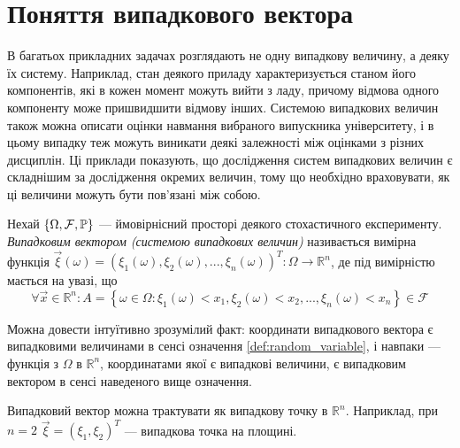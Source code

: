 \section{Поняття випадкового вектора}
В багатьох прикладних задачах розглядають не одну випадкову величину,
а деяку їх систему. Наприклад,
стан деякого приладу характеризується станом його компонентів,
які в кожен момент можуть вийти з ладу, причому відмова одного компоненту 
може пришвидшити відмову інших.
Системою випадкових величин також можна описати оцінки
навмання вибраного випускника університету, і в цьому випадку теж
можуть виникати деякі залежності між оцінками з різних дисциплін.
Ці приклади показують, що дослідження
систем випадкових величин є складнішим за дослідження окремих величин,
тому що необхідно враховувати, як ці величини можуть бути пов'язані між собою.

\begin{definition}
    Нехай $\left\{\Omega, \mathcal{F}, \P \right\}$ --- ймовірнісний просторі
    деякого стохастичного експерименту.
    \emph{Випадковим вектором (системою випадкових величин)}
    називається вимірна функція $\vec{\xi}(\omega) = 
    \left(\xi_1(\omega), \xi_2(\omega), ... , \xi_n(\omega)\right)^{T}: \Omega \rightarrow \mathbb{R}^n$, де
    під вимірністю мається на увазі, що 
    \begin{equation*}
        \forall \vec{x} \in \mathbb{R}^n: 
        A=\left\{\omega \in \Omega: \xi_1(\omega) < x_1, 
                                    \xi_2(\omega) < x_2,
                                    ... ,
                                    \xi_n(\omega) < x_n\right\}
        \in \mathcal{F}
    \end{equation*}
\end{definition}
\begin{remark}
    Можна довести інтуїтивно зрозумілий факт: координати випадкового вектора є випадковими величинами в сенсі означення 
    \ref{def:random_variable}, і навпаки --- функція з $\Omega$ в $\mathbb{R}^n$, координатами якої є випадкові величини,
    є випадковим вектором в сенсі наведеного вище означення.
\end{remark}
Випадковий вектор можна трактувати як випадкову точку в $\mathbb{R}^n$.
Наприклад, при $n = 2$ $\vec{\xi} = (\xi_1, \xi_2)^T$ --- випадкова точка на площині. 

